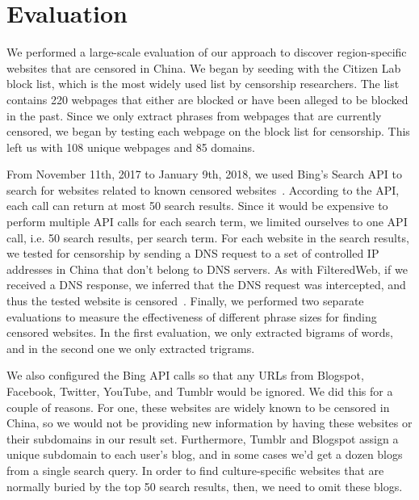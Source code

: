 

\section{Evaluation}

We performed a large-scale evaluation of our approach to
discover region-specific websites that are censored in China.  We
began by seeding with the Citizen Lab block list, which is
the most widely used list by censorship researchers. The list contains
220 webpages that either are blocked or have been alleged to be blocked in
the past. Since we only extract phrases from webpages that are
currently censored, we began by testing each webpage on the block list for
censorship. This left us with 108 unique webpages and 85 domains.

From November 11th, 2017 to January 9th, 2018, we used Bing's Search
API to search for websites related to known censored
websites~\cite{microsoft:bing}. According to the API, each call can
return at most 50 search results. Since it would be expensive to
perform multiple API calls for each search term, we limited ourselves
to one API call, i.e. 50 search results, per search term. For 
each website in the search results, we tested for censorship by
sending a DNS request to a set of controlled IP addresses in China
that don't belong to DNS servers. As with FilteredWeb, if we
received a DNS response, we inferred that the DNS request was
intercepted, and thus the tested website is
censored~\cite{darer2017filteredweb}. Finally, we performed two
separate evaluations to measure the effectiveness of different phrase
sizes for finding censored websites. In the first evaluation, we only
extracted bigrams of words, and in the second one we only extracted
trigrams.

We also configured the Bing API calls so that any URLs from Blogspot,
Facebook, Twitter, YouTube, and Tumblr would be ignored. We did this
for a couple of reasons. For one, these websites are widely known to
be censored in China, so we would not be providing new information by
having these websites or their subdomains in our result
set. Furthermore, Tumblr and Blogspot assign a unique subdomain to
each user's blog, and in some cases we'd get a dozen blogs from a
single search query. In order to find culture-specific websites that
are normally buried by the top 50 search results, then, we need to
omit these blogs.
